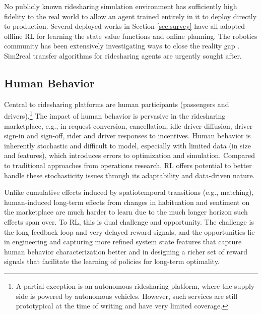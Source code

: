\documentclass{article}
\newcommand{\tq}[1]{\textcolor{red}{#1}}
\begin{document}
No publicly known ridesharing simulation environment has sufficiently high fidelity to the real world to allow an agent trained entirely in it to deploy directly to production. Several deployed works \citep{qin2020ride,jtq2021repos} in Section \ref{sec:survey} have all adopted offline RL for learning the state value functions and online planning. The robotics community has been extensively investigating ways to close the reality gap \citep{traore2019continual,mehta2020curriculum}. Sim2real transfer algorithms for ridesharing agents are urgently sought after.



\subsection{Human Behavior}\label{sec:behavior}
Central to ridesharing platforms are human participants (passengers and drivers).\footnote{A partial exception is an autonomous ridesharing platform, where the supply side is powered by autonomous vehicles. However, such services are still prototypical at the time of writing and have very limited coverage.} 
The impact of human behavior is pervasive in the ridesharing marketplace, e.g., in request conversion, cancellation, idle driver diffusion, driver sign-in and sign-off, rider and driver responses to incentives. Human behavior is inherently stochastic and difficult to model, especially with limited data (in size and features), which introduces errors to optimization and simulation. Compared to traditional approaches from operations research, RL offers potential to better handle these stochasticity issues through its adaptability and data-driven nature.

Unlike cumulative effects induced by spatiotemporal transitions (e.g., matching), human-induced long-term effects from changes in habituation and sentiment on the marketplace are much harder to learn due to the much longer horizon such effects span over. To RL, this is dual challenge and opportunity. The challenge is the long feedback loop and very delayed reward signals, and the opportunities lie in engineering and capturing more refined system state features that capture human behavior characterization better and in designing a richer set of reward signals that facilitate the learning of policies for long-term optimality.
\end{document}

